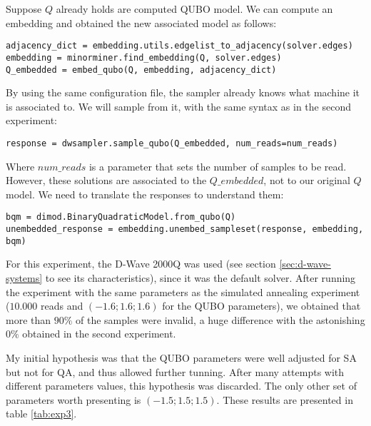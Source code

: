 Suppose $Q$ already holds are computed QUBO model. We can compute an embedding and obtained the new associated model as follows:

\begin{verbatim}
adjacency_dict = embedding.utils.edgelist_to_adjacency(solver.edges)
embedding = minorminer.find_embedding(Q, solver.edges)
Q_embedded = embed_qubo(Q, embedding, adjacency_dict)
\end{verbatim}

By using the same configuration file, the sampler already knows what machine it is associated to. We will sample from it, with the same syntax as in the second experiment:

\begin{verbatim}
response = dwsampler.sample_qubo(Q_embedded, num_reads=num_reads)
\end{verbatim}

Where $num\_reads$ is a parameter that sets the number of samples to be read. However, these solutions are associated to the $Q\_embedded$, not to our original $Q$ model. We need to translate the responses to understand them:

\begin{verbatim}
bqm = dimod.BinaryQuadraticModel.from_qubo(Q)
unembedded_response = embedding.unembed_sampleset(response, embedding, bqm)
\end{verbatim}

For this experiment, the D-Wave 2000Q was used (see section \ref{sec:d-wave-systems} to see its characteristics), since it was the default solver. After running the experiment with the same parameters as the simulated annealing experiment ($10.000$ reads and $(-1.6; 1.6; 1.6)$ for the QUBO parameters), we obtained that more than $90\%$ of the samples were invalid, a huge difference with the astonishing $0\%$ obtained in the second experiment.

My initial hypothesis was that the QUBO parameters were well adjusted for SA but not for QA, and thus allowed further tunning. After many attempts with different parameters values, this hypothesis was discarded. The only other set of parameters worth presenting is $(-1.5; 1.5; 1.5)$. These results are presented in table \ref{tab:exp3}.

